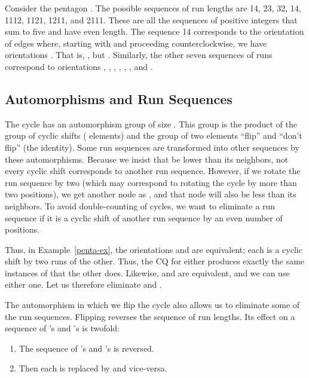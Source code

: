 \begin{example}
\label{penta-ex}
Consider the pentagon .  The possible sequences of run lengths are 14, 23, 32, 14, 1112, 1121, 1211, and 2111.  These are all the sequences of positive integers that sum to five and have even length.  The sequence 14 corresponds to the orientation of edges where, starting with  and proceeding counterclockwise, we have orientations .  That is, , but .  Similarly, the other seven sequences of runs correspond to orientations , , , , , , and .
\end{example}

\subsection{Automorphisms and Run Sequences}
\label{auto-run-subsect}

The cycle  has an automorphism group of size .  This group is the product of the group of cyclic shifts ( elements) and the group of two elements ``flip'' and ``don't flip'' (the identity).  Some run sequences are transformed into other sequences by these automorphisms.
Because we insist that  be lower than its neighbors, not every cyclic shift corresponds to another run sequence.  However, if we rotate the run sequence by two (which may correspond to rotating the cycle by more than two positions), we get another node as , and that node will also be less than its neighbors.  To avoid double-counting of cycles, we want to eliminate a run sequence if it is a cyclic shift of another run sequence by an even number of positions.


\begin{example}
\label{penta2-ex}
Thus, in Example~\ref{penta-ex}, the orientations  and  are equivalent; each is a cyclic shift by two runs of the other.  Thus, the CQ for either produces exactly the same instances of  that the other does.  Likewise,  and  are equivalent, and we can use either one.  Let us therefore eliminate  and .
\end{example}

The automorphism in which we flip the cycle also allows us to eliminate some of the run sequences.  Flipping reverses the sequence of run lengths.  Its effect on a sequence of 's and 's is twofold:

\begin{enumerate}

\item
The sequence of 's and 's is reversed.

\item
Then each  is replaced by  and vice-versa.

\end{enumerate}

